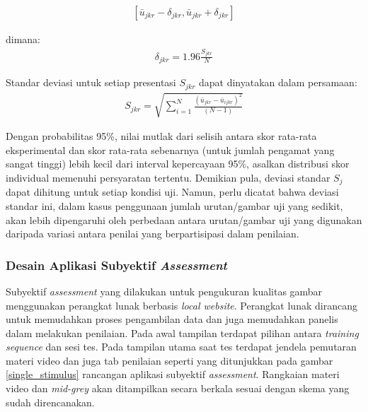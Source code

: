 \begin{equation}
	\begin{aligned}
		\left[ \bar{u}_{jkr}-\delta_{jkr}, \bar{u}_{jkr}+\delta_{jkr} \right]
	\end{aligned}
\end{equation}

\hspace{-1,2cm}dimana:
\vspace{0.5cm}
\begin{equation}
	\begin{aligned}
		\delta_{jkr}=1.96 \frac{S_{jkr}}{N}
	\end{aligned}
\end{equation}
\vspace{0.25cm}

\hspace{-1,2cm}Standar deviasi untuk setiap presentasi $S_{jkr}$ dapat dinyatakan dalam persamaan:
\begin{equation}
	\begin{aligned}
		{S_{jkr}}=\sqrt{\sum_{i=1}^{N}\frac{(\bar{u}_{jkr}-\bar{u}_{ijkr})^{2}}{(N-1)}}
	\end{aligned}
\end{equation}
\vspace{0.25cm}

Dengan probabilitas 95\%, nilai mutlak dari selisih antara skor rata-rata eksperimental dan skor rata-rata sebenarnya (untuk jumlah pengamat yang sangat tinggi) lebih kecil dari interval kepercayaan 95\%, asalkan distribusi skor individual memenuhi persyaratan tertentu. Demikian pula, deviasi standar $S_j$ dapat dihitung untuk setiap kondisi uji. Namun, perlu dicatat bahwa deviasi standar ini, dalam kasus penggunaan jumlah urutan/gambar uji yang sedikit, akan lebih dipengaruhi oleh perbedaan antara urutan/gambar uji yang digunakan daripada variasi antara penilai yang berpartisipasi dalam penilaian.


\subsubsection{Desain Aplikasi Subyektif \textit{Assessment}}
\hspace{1,2cm}
Subyektif \textit{assessment} yang dilakukan untuk pengukuran kualitas gambar menggunakan perangkat lunak berbasis \textit{local website}. Perangkat lunak dirancang untuk memudahkan proses pengambilan data dan juga memudahkan panelis dalam melakukan penilaian. Pada awal tampilan terdapat pilihan antara \textit{training sequence} dan sesi tes. Pada tampilan utama saat tes terdapat jendela pemutaran materi video dan juga tab penilaian seperti yang ditunjukkan pada gambar \ref{single_stimulus} rancangan aplikasi subyektif \textit{assessment}. Rangkaian materi video dan \textit{mid-grey} akan ditampilkan secara berkala sesuai dengan skema yang sudah direncanakan.


